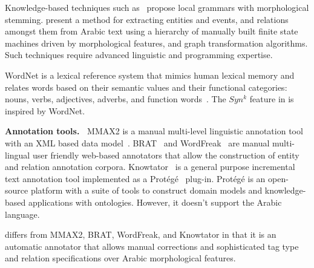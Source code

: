 Knowledge-based techniques such 
as~\cite{zaghouani2010adapting,traboulsi2009arabic} propose local grammars with morphological stemming.%
\cite{ZaMaHaCicling2012Entity} present a method for extracting entities and events, and relations amongst them from Arabic text using a hierarchy of manually built 
finite state machines driven by morphological features, 
and graph transformation algorithms. 
Such techniques require advanced linguistic and programming expertise. 

WordNet is a lexical reference system that mimics human lexical memory 
and relates words based on their semantic values and their functional 
categories: nouns, verbs, adjectives, adverbs, and function words~\cite{intro}.
The $Syn^k$ feature in \framework is inspired by WordNet.

{\bf Annotation tools.~}
MMAX2 is a manual multi-level linguistic annotation tool with an XML 
based data model~\cite{mmax2}.
BRAT~\cite{brat} and WordFreak~\cite{wordfreak} are manual 
multi-lingual user friendly web-based annotators that allow the construction 
of entity and relation annotation corpora.
Knowtator~\cite{ogren2006knowtator} is a general purpose incremental text annotation tool 
implemented as a Prot\'eg\'e~\cite{gennari2003evolution} plug-in. 
Prot\'eg\'e is an open-source platform with a suite of tools to construct domain models and knowledge-based applications with ontologies. 
However, it doesn't support the Arabic language.

\framework differs from MMAX2, BRAT, WordFreak, and Knowtator in that it is 
an automatic annotator that allows manual corrections 
and sophisticated tag type and relation specifications over
Arabic morphological features.

